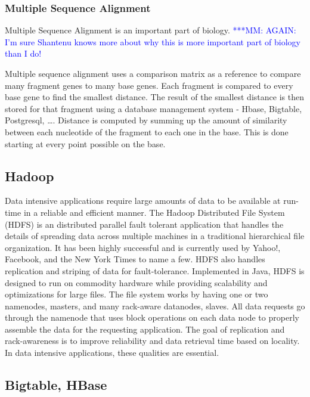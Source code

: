 \documentclass[conference,final]{IEEEtran}
\newcommand{\michaelnote}[1]{ {\textcolor{blue} { ***MM: #1 }}}
\newcommand{\michaelnote}[1]{ {\textcolor{blue} { ***MM: #1 }}}
\begin{document}
\subsubsection{Multiple Sequence Alignment}

Multiple Sequence Alignment is an important part of biology.
\michaelnote{AGAIN:  I'm sure Shantenu knows more about why this is 
more important part of biology than I do!}

Multiple sequence alignment uses a comparison matrix as a reference to
compare many fragment genes to many base genes.  Each fragment is
compared to every base gene to find the smallest distance.  The result
of the smallest distance is then stored for that fragment using a
database management system - Hbase, Bigtable, Postgresql, \ldots.
Distance is computed by summing up the amount of similarity between
each nucleotide of the fragment to each one in the base.  This is done
starting at every point possible on the base.


\subsection*{Hadoop}

Data intensive applications require large amounts of data to be
available at run-time in a reliable and efficient manner.  The Hadoop
Distributed File System (HDFS) is an distributed parallel fault
tolerant application that handles the details of spreading data across
multiple machines in a traditional hierarchical file organization.  It
has been highly successful and is currently used by Yahoo!, Facebook,
and the New York Times to name a few.  HDFS also handles replication
and striping of data for fault-tolerance.  Implemented in Java, HDFS
is designed to run on commodity hardware while providing scalability
and optimizations for large files.  The file system works by having
one or two namenodes, masters, and many rack-aware datanodes, slaves.
All data requests go through the namenode that uses block operations
on each data node to properly assemble the data for the requesting
application.  The goal of replication and rack-awareness is to improve
reliability and data retrieval time based on locality.  In data
intensive applications, these qualities are essential.

\subsection*{Bigtable, HBase}
\end{document}
